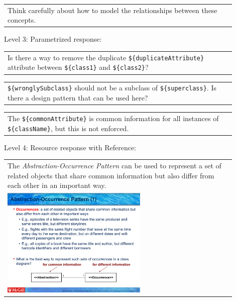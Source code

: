 \begin{tabular}{|p{0.9\linewidth}}
Think carefully about how to model the relationships between these concepts.
\end{tabular} \medskip

\noindent Level 3: Parametrized response: \medskip

\begin{tabular}{|p{0.9\linewidth}}
Is there a way to remove the duplicate \verb|${duplicateAttribute}| attribute between \verb|${class1}| and \verb|${class2}|?
\end{tabular} \medskip

\begin{tabular}{|p{0.9\linewidth}}
\verb|${wronglySubclass}| should not be a subclass of \verb|${superclass}|. Is there a design pattern that can be used here?
\end{tabular} \medskip

\begin{tabular}{|p{0.9\linewidth}}
The \verb|${commonAttribute}| is common information for all instances of \verb|${className}|, but this is not enforced.
\end{tabular} \medskip

\noindent Level 4: Resource response with Reference: \medskip

\begin{tabular}{|p{0.9\linewidth}}
The \textit{Abstraction-Occurrence Pattern} can be used to 
represent a set of related objects that share common information but also differ
from each other in an important way.

\\
\includegraphics[width=0.6\textwidth]{images/abstraction_occurrence.png}
\end{tabular} \medskip



